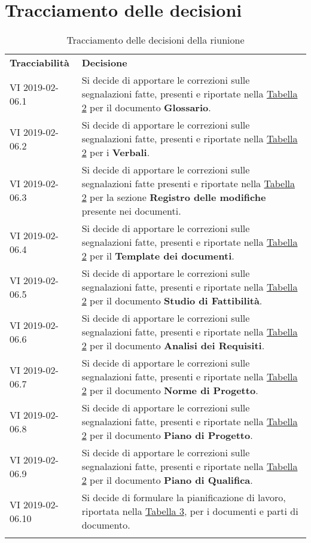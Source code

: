 \clearpage
\section{Tracciamento delle decisioni}
\begin{center}
	\renewcommand{\arraystretch}{1.5}
	\begin{longtable}{  p{2.8cm} p{11.4cm} }
		\rowcolor{tableHeadYellow}
		\textbf{Tracciabilità}&\textbf{Decisione}\\
		VI 2019-02-06.1 & Si decide di apportare le correzioni sulle segnalazioni fatte, presenti e riportate nella \hyperref[sec:tabella_riassuntiva1]{Tabella 2} per il documento \textbf{Glossario}.\\
		VI 2019-02-06.2 & Si decide di apportare le correzioni sulle segnalazioni fatte, presenti e riportate  nella \hyperref[sec:tabella_riassuntiva1]{Tabella 2} per i \textbf{Verbali}.\\
		VI 2019-02-06.3 & Si decide di apportare le correzioni sulle segnalazioni fatte presenti e riportate  nella \hyperref[sec:tabella_riassuntiva1]{Tabella 2} per la sezione \textbf{Registro delle modifiche} presente nei documenti.\\
		VI 2019-02-06.4 & Si decide di apportare le correzioni sulle segnalazioni fatte, presenti e riportate  nella \hyperref[sec:tabella_riassuntiva1]{Tabella 2} per il \textbf{Template dei documenti}.\\
		VI 2019-02-06.5 & Si decide di apportare le correzioni sulle segnalazioni fatte, presenti e riportate  nella \hyperref[sec:tabella_riassuntiva1]{Tabella 2} per il documento \textbf{Studio di Fattibilità}.\\
		VI 2019-02-06.6 & Si decide di apportare le correzioni sulle segnalazioni fatte, presenti e riportate  nella \hyperref[sec:tabella_riassuntiva1]{Tabella 2} per il documento \textbf{Analisi dei Requisiti}.\\
		VI 2019-02-06.7 & Si decide di apportare le correzioni sulle segnalazioni fatte, presenti e riportate  nella \hyperref[sec:tabella_riassuntiva1]{Tabella 2} per il documento \textbf{Norme di Progetto}.\\
		VI 2019-02-06.8 & Si decide di apportare le correzioni sulle segnalazioni fatte, presenti e riportate  nella \hyperref[sec:tabella_riassuntiva1]{Tabella 2} per il documento \textbf{Piano di Progetto}.\\
		VI 2019-02-06.9 & Si decide di apportare le correzioni sulle segnalazioni fatte, presenti e riportate  nella \hyperref[sec:tabella_riassuntiva1]{Tabella 2} per il documento \textbf{Piano di Qualifica}.\\
		VI 2019-02-06.10 & Si decide di formulare la pianificazione di lavoro, riportata nella \hyperref[sec:tabella_riassuntiva2]{Tabella 3}, per i documenti e parti di documento.\\
		\rowcolor{white}
		\caption{Tracciamento delle decisioni della riunione}
	\end{longtable}	
\end{center}